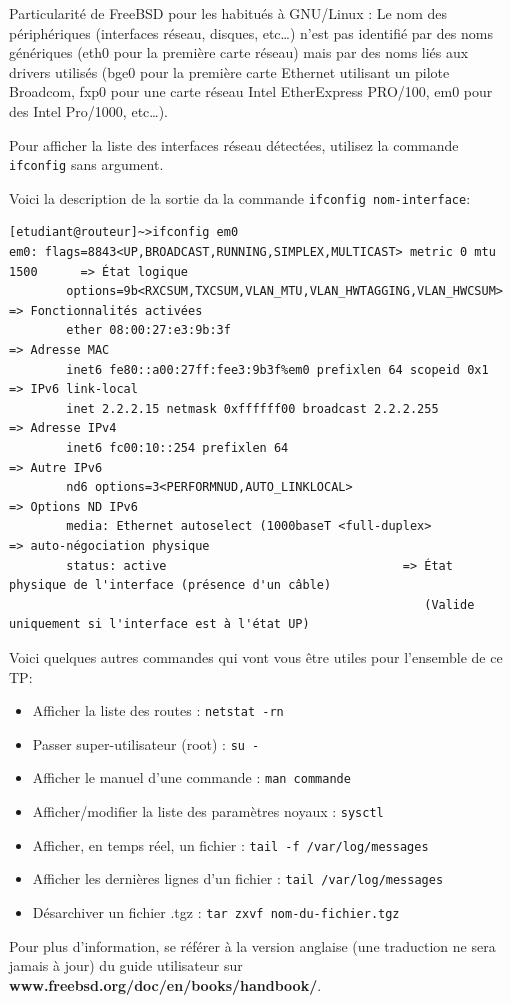 \documentclass[a4paper,11pt]{article}
\newcommand{\shellcmd}[1]{\texttt{#1}}
\begin{document}
Particularité de FreeBSD pour les habitués à GNU/Linux : Le nom des périphériques (interfaces réseau, disques, etc…) n'est pas identifié par des noms génériques (eth0 pour la première carte réseau) mais par des noms liés aux drivers utilisés (bge0 pour la première carte Ethernet utilisant un pilote Broadcom, fxp0 pour une carte réseau Intel EtherExpress PRO/100, em0 pour des Intel Pro/1000, etc…).

Pour afficher la liste des interfaces réseau détectées, utilisez la commande \shellcmd{ifconfig} sans argument.

Voici la description de la sortie da la commande \shellcmd{ifconfig nom-interface}:
\footnotesize
\begin{verbatim}
[etudiant@routeur]~>ifconfig em0
em0: flags=8843<UP,BROADCAST,RUNNING,SIMPLEX,MULTICAST> metric 0 mtu 1500      => État logique
        options=9b<RXCSUM,TXCSUM,VLAN_MTU,VLAN_HWTAGGING,VLAN_HWCSUM>          => Fonctionnalités activées
        ether 08:00:27:e3:9b:3f                                                => Adresse MAC
        inet6 fe80::a00:27ff:fee3:9b3f%em0 prefixlen 64 scopeid 0x1            => IPv6 link-local
        inet 2.2.2.15 netmask 0xffffff00 broadcast 2.2.2.255                 => Adresse IPv4
        inet6 fc00:10::254 prefixlen 64                                        => Autre IPv6
        nd6 options=3<PERFORMNUD,AUTO_LINKLOCAL>                               => Options ND IPv6
        media: Ethernet autoselect (1000baseT <full-duplex>                    => auto-négociation physique
        status: active                                 => État physique de l'interface (présence d'un câble)
                                                          (Valide uniquement si l'interface est à l'état UP)
\end{verbatim}
\normalsize
Voici quelques autres commandes qui vont vous être utiles pour l'ensemble de ce TP:
\begin{itemize}
\item Afficher la liste des routes : \shellcmd{netstat -rn}
\item Passer super-utilisateur (root) : \shellcmd{su -}
\item Afficher le manuel d'une commande : \shellcmd{man commande}
\item Afficher/modifier la liste des paramètres noyaux : \shellcmd{sysctl}
\item Afficher, en temps réel, un fichier : \shellcmd{tail -f /var/log/messages}
\item Afficher les dernières lignes d'un fichier : \shellcmd{tail /var/log/messages}
\item Désarchiver un fichier .tgz : \shellcmd{tar zxvf nom-du-fichier.tgz}
\end{itemize}
Pour plus d'information, se référer à la version anglaise (une traduction ne sera jamais à jour) du guide utilisateur sur \textbf{www.freebsd.org/doc/en/books/handbook/}.
\end{document}
